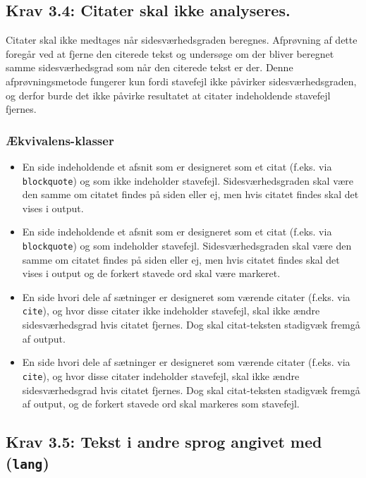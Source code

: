 \documentclass[a4paper,oneside,article]{memoir}
\begin{document}
\begin{landscape}
\subsection{Krav 3.4: Citater skal ikke analyseres.}

Citater skal ikke medtages når sidesværhedsgraden beregnes. Afprøvning
af dette foregår ved at fjerne den citerede tekst og undersøge om der
bliver beregnet samme sidesværhedsgrad som når den citerede tekst er
der. Denne afprøvningsmetode fungerer kun fordi stavefejl ikke
påvirker sidesværhedsgraden, og derfor burde det ikke påvirke
resultatet at citater indeholdende stavefejl fjernes.

\subsubsection{Ækvivalens-klasser}
\begin{itemize}
\item En side indeholdende et afsnit som er designeret som et citat
  (f.eks. via \texttt{blockquote}) og som ikke indeholder
  stavefejl. Sidesværhedsgraden skal være den samme om citatet findes
  på siden eller ej, men hvis citatet findes skal det vises i output.
\item En side indeholdende et afsnit som er designeret som et citat
  (f.eks. via \texttt{blockquote}) og som indeholder
  stavefejl. Sidesværhedsgraden skal være den samme om citatet findes
  på siden eller ej, men hvis citatet findes skal det vises i output
  og de forkert stavede ord skal være markeret.
\item En side hvori dele af sætninger er designeret som værende
  citater (f.eks. via \texttt{cite}), og hvor disse citater ikke
  indeholder stavefejl, skal ikke ændre sidesværhedsgrad hvis citatet
  fjernes. Dog skal citat-teksten stadigvæk fremgå af output.
\item En side hvori dele af sætninger er designeret som værende
  citater (f.eks. via \texttt{cite}), og hvor disse citater indeholder
  stavefejl, skal ikke ændre sidesværhedsgrad hvis citatet
  fjernes. Dog skal citat-teksten stadigvæk fremgå af output, og de
  forkert stavede ord skal markeres som stavefejl.
\end{itemize}

\subsection{Krav 3.5: Tekst i andre sprog angivet med
  (\texttt{lang})}


\end{landscape}
\end{document}
